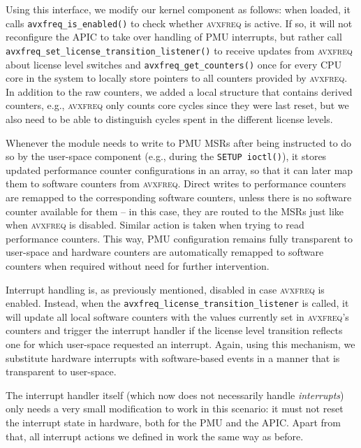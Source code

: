 Using this interface, we modify our kernel component as follows: when loaded, it calls \texttt{avxfreq\_is\_enabled()} to check whether \textsc{avxfreq} is active. If so, it will not reconfigure the \gls{APIC} to take over handling of \gls{PMU} interrupts, but rather call \texttt{avxfreq\_set\_license\_transition\_listener()} to receive updates from \textsc{avxfreq} about license level switches and \texttt{avxfreq\_get\_counters()} once for every \gls{CPU} core in the system to locally store pointers to all counters provided by \textsc{avxfreq}. In addition to the raw counters, we added a local structure that contains derived counters, e.g., \textsc{avxfreq} only counts core cycles since they were last reset, but we also need to be able to distinguish cycles spent in the different license levels.

Whenever the module needs to write to \gls{PMU} \glspl{MSR} after being instructed to do so by the user-space component (e.g., during the \texttt{SETUP ioctl()}), it stores updated performance counter configurations in an array, so that it can later map them to software counters from \textsc{avxfreq}. Direct writes to performance counters are remapped to the corresponding software counters, unless there is no software counter available for them -- in this case, they are routed to the \glspl{MSR} just like when \textsc{avxfreq} is disabled. Similar action is taken when trying to read performance counters. This way, \gls{PMU} configuration remains fully transparent to user-space and hardware counters are automatically remapped to software counters when required without need for further intervention.

Interrupt handling is, as previously mentioned, disabled in case \textsc{avxfreq} is enabled. Instead, when the \texttt{avxfreq\_license\_transition\_listener} is called, it will update all local software counters with the values currently set in \textsc{avxfreq}'s counters and trigger the interrupt handler if the license level transition reflects one for which user-space requested an interrupt. Again, using this mechanism, we substitute hardware interrupts with software-based events in a manner that is transparent to user-space.

The interrupt handler itself (which now does not necessarily handle \emph{interrupts}) only needs a very small modification to work in this scenario: it must not reset the interrupt state in hardware, both for the \gls{PMU} and the \gls{APIC}. Apart from that, all interrupt actions we defined in  work the same way as before.

